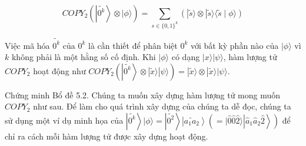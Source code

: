 \documentclass[10pt]{article}
\begin{document}
$$
C O P Y_{2}\left(\left|\widetilde{0^{k}}\right\rangle \otimes|\phi\rangle\right)=\sum_{s \in\{0,1\}^{k}}(|\tilde{s}\rangle \otimes|\tilde{s}\rangle\langle\tilde{s} \mid \phi\rangle)
$$

Việc mã hóa $\widetilde{0^{k}}$ của $0^{k}$ là cần thiết để phân biệt $0^{k}$ với bất kỳ phần nào của $|\phi\rangle$ vì $k$ không phải là một hằng số cố định. Khi $|\phi\rangle$ có dạng $|x\rangle|\psi\rangle$, hàm lượng tử $C O P Y_{2}$ hoạt động như $C O P Y_{2}\left(\left|\widetilde{0^{k}}\right\rangle \otimes|\tilde{x}\rangle|\psi\rangle\right)=|\tilde{x}\rangle \otimes|\tilde{x}\rangle|\psi\rangle$.

Chứng minh Bổ đề 5.2. Chúng ta muốn xây dựng hàm lượng tử mong muốn $C O P Y_{2}$ như sau. Để làm cho quá trình xây dựng của chúng ta dễ đọc, chúng ta sử dụng một ví dụ minh họa của $\left|\widetilde{0^{k}}\right\rangle|\phi\rangle=\left|\widetilde{0^{2}}\right\rangle\left|\widetilde{a_{1} a_{2}}\right\rangle\left(=|\hat{0} \hat{0} \hat{2}\rangle\left|\hat{a}_{1} \hat{a}_{2} \hat{2}\right\rangle\right)$ để chỉ ra cách mỗi hàm lượng tử được xây dựng hoạt động.
\end{document}
